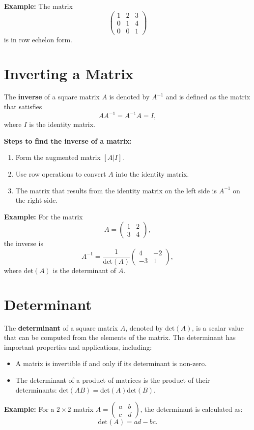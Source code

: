 \documentclass[]{article}
\begin{document}
	\textbf{Example:} The matrix
	\[
	\begin{pmatrix}
		1 & 2 & 3 \\
		0 & 1 & 4 \\
		0 & 0 & 1
	\end{pmatrix}
	\]
	is in row echelon form.
	
	\section{Inverting a Matrix}
	
	The \textbf{inverse} of a square matrix $A$ is denoted by $A^{-1}$ and is defined as the matrix that satisfies
	\[
	AA^{-1} = A^{-1}A = I,
	\]
	where $I$ is the identity matrix.
	
	\textbf{Steps to find the inverse of a matrix:}
	\begin{enumerate}
		\item Form the augmented matrix $[A | I]$.
		\item Use row operations to convert $A$ into the identity matrix.
		\item The matrix that results from the identity matrix on the left side is $A^{-1}$ on the right side.
	\end{enumerate}
	
	\textbf{Example:} For the matrix
	\[
	A = \begin{pmatrix} 1 & 2 \\ 3 & 4 \end{pmatrix},
	\]
	the inverse is
	\[
	A^{-1} = \frac{1}{\text{det}(A)}\begin{pmatrix} 4 & -2 \\ -3 & 1 \end{pmatrix},
	\]
	where $\text{det}(A)$ is the determinant of $A$.
	
	\section{Determinant}
	
	The \textbf{determinant} of a square matrix $A$, denoted by $\text{det}(A)$, is a scalar value that can be computed from the elements of the matrix. The determinant has important properties and applications, including:
	\begin{itemize}
		\item A matrix is invertible if and only if its determinant is non-zero.
		\item The determinant of a product of matrices is the product of their determinants: $\text{det}(AB) = \text{det}(A)\text{det}(B)$.
	\end{itemize}
	
	\textbf{Example:} For a $2 \times 2$ matrix $A = \begin{pmatrix} a & b \\ c & d \end{pmatrix}$, the determinant is calculated as:
	\[
	\text{det}(A) = ad - bc.
	\]
	
	
\end{document}
